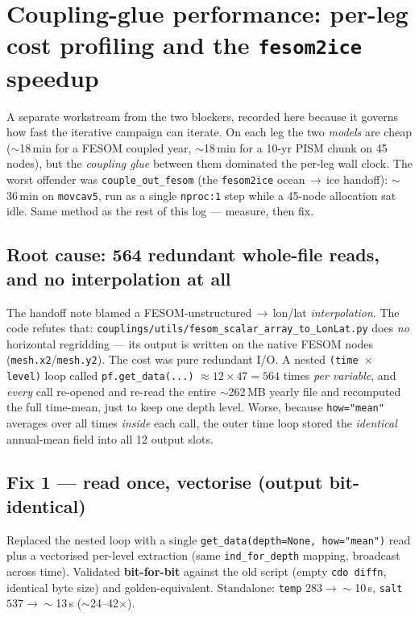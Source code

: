 \documentclass[11pt,a4paper]{article}
\newcommand{\code}[1]{\texttt{\small #1}}
\newcommand{\file}[1]{\texttt{\footnotesize #1}}
\begin{document}
\section{Coupling-glue performance: per-leg cost profiling and the \code{fesom2ice} speedup}\label{sec:perf}
A separate workstream from the two blockers, recorded here because it governs how fast the
iterative campaign can iterate. On each leg the two \emph{models} are cheap ($\sim$18\,min for
a FESOM coupled year, $\sim$18\,min for a 10-yr PISM chunk on 45 nodes), but the \emph{coupling
glue} between them dominated the per-leg wall clock. The worst offender was
\code{couple\_out\_fesom} (the \code{fesom2ice} ocean\,$\to$\,ice handoff): $\sim$36\,min on
\code{movcav5}, run as a single \code{nproc:1} step while a 45-node allocation sat idle. Same
method as the rest of this log --- measure, then fix.

\subsection{Root cause: 564 redundant whole-file reads, and no interpolation at all}
The handoff note blamed a FESOM-unstructured\,$\to$\,lon/lat \emph{interpolation}. The code
refutes that: \file{couplings/utils/fesom\_scalar\_array\_to\_LonLat.py} does \emph{no}
horizontal regridding --- its output is written on the native FESOM nodes
(\code{mesh.x2}/\code{mesh.y2}). The cost was pure redundant I/O. A nested
\code{(time $\times$ level)} loop called \code{pf.get\_data(...)} $\approx 12\times47=564$ times
\emph{per variable}, and \emph{every} call re-opened and re-read the entire $\sim$262\,MB yearly
file and recomputed the full time-mean, just to keep one depth level. Worse, because
\code{how="mean"} averages over all times \emph{inside} each call, the outer time loop stored the
\emph{identical} annual-mean field into all 12 output slots.

\subsection{Fix 1 --- read once, vectorise (output bit-identical)}
Replaced the nested loop with a single \code{get\_data(depth=None, how="mean")} read plus a
vectorised per-level extraction (same \code{ind\_for\_depth} mapping, broadcast across time).
Validated \textbf{bit-for-bit} against the old script (empty \code{cdo diffn}, identical byte
size) and golden-equivalent. Standalone: \code{temp} $283\to\sim$10\,s, \code{salt}
$537\to\sim$13\,s ($\sim$24--42$\times$).
\end{document}
